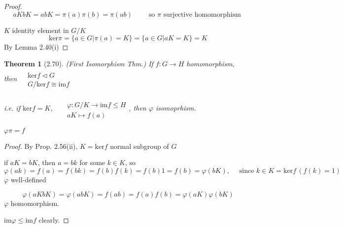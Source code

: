 \documentclass[twoside,landscape]{amsart}
\theoremstyle{plain}
\newtheorem{theorem}{Theorem}
\theoremstyle{definition}
\theoremstyle{remark}
\begin{document}
\begin{multicols*}{2}
\begin{proof}
\[
aK bK = abK = \pi(a) \pi(b) = \pi(ab) \quad \quad \text{ so $\pi$ surjective homomorphism }
\]

$K$ identity element in $G/K$ 
\[
\text{ker}{\pi} = \lbrace a \in G | \pi(a) = K \rbrace = \lbrace a \in G | aK = K \rbrace = K 
\]
By Lemma 2.40(i)

\end{proof}

\begin{theorem}[2.70] (First Isomorphism Thm.)
If $f: G \to H$ homomorphism, \\
then $\begin{aligned} & \quad \\ 
  & \text{ker}{f} \lhd G \\ 
  & G/\text{ker}{f} \cong \text{im}{f} \end{aligned}$

i.e. if $\text{ker}{f} = K $, \, $\begin{aligned} & \quad \\ & \varphi : G/K \to \text{im}{f} \leq H \\ & aK \mapsto f(a) \end{aligned}$, then $\varphi$ isomoprhism.  

 \quad \quad $\varphi \pi = f$





\end{theorem}

\begin{proof} By Prop. 2.56(ii), $K = \text{ker}{f}$ \quad normal subgroup of $G$ 

if $aK = bK$, then $a=bk$ for some $k \in K$, so 
\[
\varphi(ak) = f(a) = f(bk) = f(b) f(k) = f(b) 1 = f(b) = \varphi(bK) , \quad \text{ since } k \in K = \text{ker}{f} \, (f(k) = 1) 
\]
$\varphi$ well-defined 

\[
\varphi(a K bK ) = \varphi(ab K) = f(ab) = f(a) f(b) = \varphi(aK) \varphi(bK) 
\]
$\varphi$ homomorphism.  

$\text{im}{\varphi} \leq \text{im}{f}$ clearly.  


\end{proof}
\end{multicols*}
\end{document}

